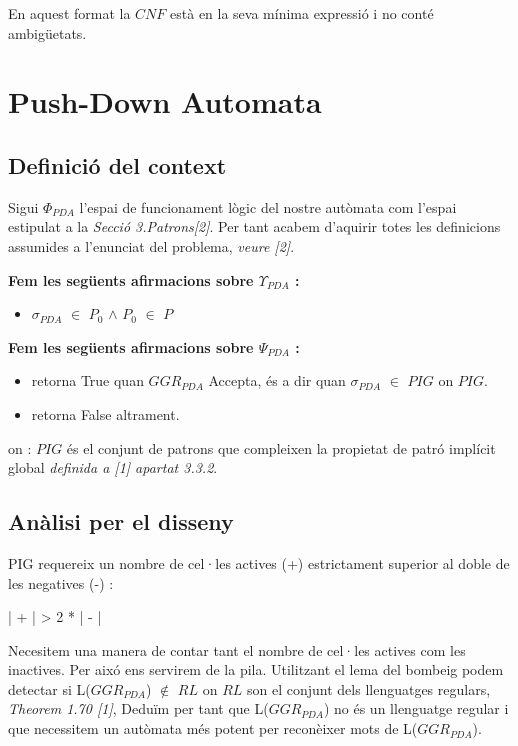 \documentclass[12pt,a4paper]{report}
\def \wpda{$\sigma_{PDA} $}
\def \pda{$GGR_{PDA} $}
\def \contextPDA{$\Phi_{PDA}$}
\def \prePDA{$\Upsilon_{PDA}$}
\def \postPDA{$\Psi_{PDA}$}
\begin{document}
En aquest format la $CNF$ està en la seva mínima expressió i no conté ambigüetats.

\clearpage

\chapter{Push-Down Automata}

\section{Definició del context}

Sigui \contextPDA{} l'espai de funcionament lògic del nostre autòmata com l'espai estipulat a la \textit{Secció 3.Patrons[2]}. Per tant acabem d'aquirir totes les definicions assumides a l'enunciat del problema, \textit{veure [2]}.

\textbf{Fem les següents afirmacions sobre \prePDA{} :}
\begin{itemize}
\item \wpda{} $\in$ $P_0$ $\wedge$ $P_0$ $\in$ $P$
\end{itemize}

\textbf{Fem les següents afirmacions sobre \postPDA{} :}
\begin{itemize}
\item retorna True quan \pda{} Accepta, és a dir quan \wpda{} $\in$ $PIG$ on $PIG$.
\item retorna False altrament.
\end{itemize}
on : $PIG$ és el conjunt de patrons que compleixen la propietat de patró implícit global \textit{definida a [1] apartat 3.3.2}.

\section{Anàlisi per el disseny}

PIG requereix un nombre de cel·les actives (+) estrictament superior al doble de les negatives (-) : 

\begin{center}
| + | > 2 * | - |
\end{center}

Necesitem una manera de contar tant el nombre de cel·les actives com les inactives. Per aixó ens servirem de la pila. Utilitzant el lema del bombeig podem detectar si L(\pda{}) $\not\in$ $RL$ on $RL$ son el conjunt dels llenguatges regulars, \textit{Theorem 1.70 [1]}, Deduïm per tant que L(\pda) no és un llenguatge regular i que necessitem un autòmata més potent per reconèixer mots de L(\pda).
\end{document}
